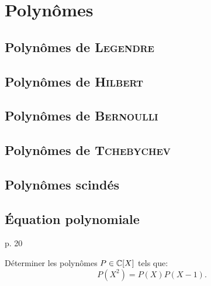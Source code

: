 \chapter{Polynômes}



\newpage

\section{Polynômes de \textsc{Legendre}}


\section{Polynômes de \textsc{Hilbert}}


\section{Polynômes de \textsc{Bernoulli}}


\section{Polynômes de \textsc{Tchebychev}}


\section{Polynômes scindés}


\section{Équation polynomiale}
\cite{exos_oraux} p. 20 \\
\begin{exercice}
    Déterminer les polynômes $P \in \mathbb{C}[X]$ tels que:
    $$P(X^2) = P(X) P(X-1).$$
\end{exercice}
